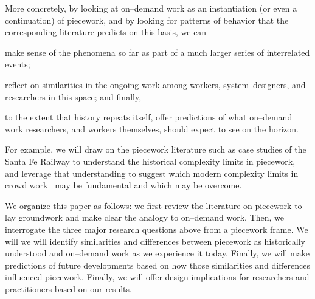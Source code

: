 \documentclass[trackingWork]{subfiles}
\begin{document}
More concretely, by looking at on--demand work as
an instantiation (or even a continuation) of piecework,
and by looking for patterns of behavior that the corresponding literature predicts
on this basis, we can
\begin{inlinelist}
  \item make sense of the phenomena so far as part of a much larger series of interrelated events;
  \item reflect on similarities in the ongoing work among
        workers,
        system--designers, and
        researchers in this space;
        and finally,
  \item to the extent that history repeats itself, offer predictions of what on--demand work researchers,
        and workers themselves,
        should expect to see on the horizon.
\end{inlinelist}
For example, we will draw on the piecework literature such as case studies of the Santa Fe Railway to understand the historical complexity limits in piecework, and leverage that understanding to suggest which modern complexity limits in crowd work~\cite{crowdworkFuture} may be fundamental and which may be overcome.


We organize this paper as follows: we first review the literature on piecework to lay  groundwork and make clear the analogy to on--demand work. Then, we interrogate the three major research questions above from a piecework frame. We will 
we will identify similarities and differences between piecework as historically understood and
on--demand work as we experience it today.
Finally, we will make predictions of future developments based on how those similarities and differences influenced piecework.
Finally, we will offer design implications for researchers and practitioners based on our results.


\onlyinsubfile{
  \balance{}
  \printbibliography
}
\end{document}
